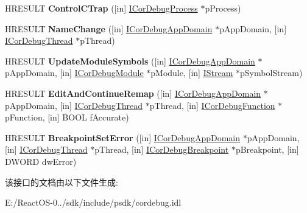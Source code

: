 \begin{DoxyCompactItemize}
H\+R\+E\+S\+U\+LT {\bfseries Control\+C\+Trap} (\mbox{[}in\mbox{]} \hyperlink{interface_i_cor_debug_process}{I\+Cor\+Debug\+Process} $\ast$p\+Process)
\item 
\mbox{\label{interface_i_cor_debug_managed_callback_a90894157959c2b21e51d3cd2ae678ac2}} 
H\+R\+E\+S\+U\+LT {\bfseries Name\+Change} (\mbox{[}in\mbox{]} \hyperlink{interface_i_cor_debug_app_domain}{I\+Cor\+Debug\+App\+Domain} $\ast$p\+App\+Domain, \mbox{[}in\mbox{]} \hyperlink{interface_i_cor_debug_thread}{I\+Cor\+Debug\+Thread} $\ast$p\+Thread)
\item 
\mbox{\label{interface_i_cor_debug_managed_callback_a669fc3bc40e1e94a1812c6dcb0d87ef7}} 
H\+R\+E\+S\+U\+LT {\bfseries Update\+Module\+Symbols} (\mbox{[}in\mbox{]} \hyperlink{interface_i_cor_debug_app_domain}{I\+Cor\+Debug\+App\+Domain} $\ast$p\+App\+Domain, \mbox{[}in\mbox{]} \hyperlink{interface_i_cor_debug_module}{I\+Cor\+Debug\+Module} $\ast$p\+Module, \mbox{[}in\mbox{]} \hyperlink{interface_i_stream}{I\+Stream} $\ast$p\+Symbol\+Stream)
\item 
\mbox{\label{interface_i_cor_debug_managed_callback_ac4a5a1c7fc4f6fc9d317c67e93fca244}} 
H\+R\+E\+S\+U\+LT {\bfseries Edit\+And\+Continue\+Remap} (\mbox{[}in\mbox{]} \hyperlink{interface_i_cor_debug_app_domain}{I\+Cor\+Debug\+App\+Domain} $\ast$p\+App\+Domain, \mbox{[}in\mbox{]} \hyperlink{interface_i_cor_debug_thread}{I\+Cor\+Debug\+Thread} $\ast$p\+Thread, \mbox{[}in\mbox{]} \hyperlink{interface_i_cor_debug_function}{I\+Cor\+Debug\+Function} $\ast$p\+Function, \mbox{[}in\mbox{]} B\+O\+OL f\+Accurate)
\item 
\mbox{\label{interface_i_cor_debug_managed_callback_ad2dab3382aa42bb3b90e3437d2939017}} 
H\+R\+E\+S\+U\+LT {\bfseries Breakpoint\+Set\+Error} (\mbox{[}in\mbox{]} \hyperlink{interface_i_cor_debug_app_domain}{I\+Cor\+Debug\+App\+Domain} $\ast$p\+App\+Domain, \mbox{[}in\mbox{]} \hyperlink{interface_i_cor_debug_thread}{I\+Cor\+Debug\+Thread} $\ast$p\+Thread, \mbox{[}in\mbox{]} \hyperlink{interface_i_cor_debug_breakpoint}{I\+Cor\+Debug\+Breakpoint} $\ast$p\+Breakpoint, \mbox{[}in\mbox{]} D\+W\+O\+RD dw\+Error)
\end{DoxyCompactItemize}


该接口的文档由以下文件生成\+:\begin{DoxyCompactItemize}
\item 
E\+:/\+React\+O\+S-\/0../sdk/include/psdk/cordebug.\+idl\end{DoxyCompactItemize}
